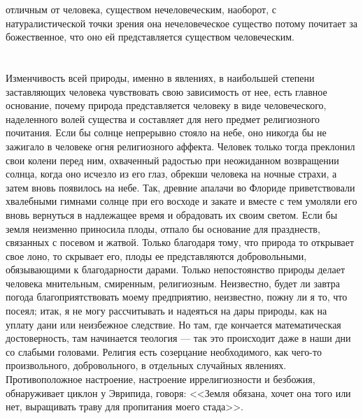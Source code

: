\documentclass[12pt,oneside]{book}
\begin{document}
отличным от человека, существом нечеловеческим, наоборот, с натуралистической точки зрения она нечеловеческое существо потому почитает за божественное, что оно ей представляется существом человеческим.


\chapter{}

Изменчивость всей природы, именно в явлениях, в наибольшей степени заставляющих человека чувствовать свою зависимость от нее, есть главное основание, почему природа представляется человеку в виде человеческого, наделенного волей существа и составляет для него предмет религиозного почитания. Если бы солнце непрерывно стояло на небе, оно никогда бы не зажигало в человеке огня религиозного аффекта. Человек только тогда преклонил свои колени перед ним, охваченный радостью при неожиданном возвращении солнца, когда оно исчезло из его глаз, обрекши человека на ночные страхи, а затем вновь появилось на небе. Так, древние апалачи во Флориде приветствовали хвалебными гимнами солнце при его восходе и закате и вместе с тем умоляли его вновь вернуться в надлежащее время и обрадовать их своим светом. Если бы земля неизменно приносила плоды, отпало бы основание для празднеств, связанных с посевом и жатвой. Только благодаря тому, что природа то открывает свое лоно, то скрывает его, плоды ее представляются добровольными, обязывающими к благодарности дарами. Только непостоянство природы делает человека мнительным, смиренным, религиозным. Неизвестно, будет ли завтра погода благоприятствовать моему предприятию, неизвестно, пожну ли я то, что посеял; итак, я не могу рассчитывать и надеяться на дары природы, как на уплату дани или неизбежное следствие. Но там, где кончается математическая достоверность, там начинается теология --- так это происходит даже в наши дни со слабыми головами. Религия есть созерцание необходимого, как чего-то произвольного, добровольного, в отдельных случайных явлениях. Противоположное настроение, настроение иррелигиозности и безбожия, обнаруживает циклон у Эврипида, говоря: <<Земля обязана, хочет она того или нет, выращивать траву для пропитания моего стада>>.


\chapter{}
\end{document}
